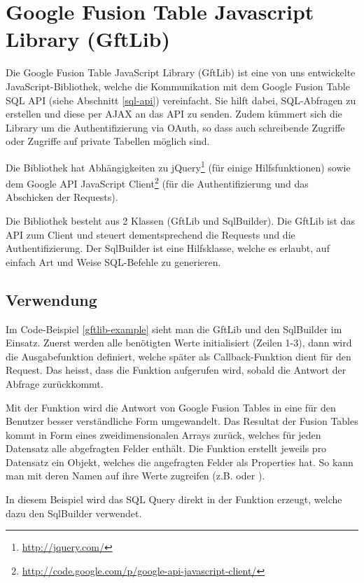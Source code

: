 \section{Google Fusion Table Javascript Library (GftLib)}
\label{gftlib-js}
Die Google Fusion Table JavaScript Library (GftLib) ist eine von uns entwickelte JavaScript-Bibliothek, welche die Kommunikation mit dem Google Fusion Table SQL \gls{API} (siehe Abschnitt \ref{sql-api}) vereinfacht. Sie hilft dabei, SQL-Abfragen zu erstellen und diese per \gls{AJAX} an das \gls{API} zu senden. Zudem kümmert sich die Library um die Authentifizierung via \gls{OAuth}, so dass auch schreibende Zugriffe oder Zugriffe auf private Tabellen möglich sind.

Die Bibliothek hat Abhängigkeiten zu jQuery\footnote{\url{http://jquery.com/}} (für einige Hilfsfunktionen) sowie dem Google \gls{API} JavaScript Client\footnote{\url{http://code.google.com/p/google-api-javascript-client/}} (für die Authentifizierung und das Abschicken der Requests).

Die Bibliothek besteht aus 2 Klassen (GftLib und SqlBuilder). Die GftLib ist das \gls{API} zum Client und steuert dementsprechend die Requests und die Authentifizierung. Der SqlBuilder ist eine Hilfsklasse, welche es erlaubt, auf einfach Art und Weise SQL-Befehle zu generieren.

\subsection{Verwendung}
Im Code-Beispiel \ref{gftlib-example} sieht man die GftLib und den SqlBuilder im Einsatz. Zuerst werden alle benötigten Werte initialisiert (Zeilen 1-3), dann wird die Ausgabefunktion  definiert, welche später als Callback-Funktion dient für den Request. Das heisst, dass die Funktion aufgerufen wird, sobald die Antwort der Abfrage zurückkommt. 

Mit der Funktion  wird die Antwort von Google Fusion Tables in eine für den Benutzer besser verständliche Form umgewandelt. Das Resultat der Fusion Tables kommt in Form eines zweidimensionalen Arrays zurück, welches für jeden Datensatz alle abgefragten Felder enthält. Die Funktion erstellt jeweils pro Datensatz ein Objekt, welches die angefragten Felder als Properties hat. So kann man mit deren Namen auf ihre Werte zugreifen (z.B.  oder ).

In diesem Beispiel wird das SQL Query direkt in der Funktion  erzeugt, welche dazu den SqlBuilder verwendet.

